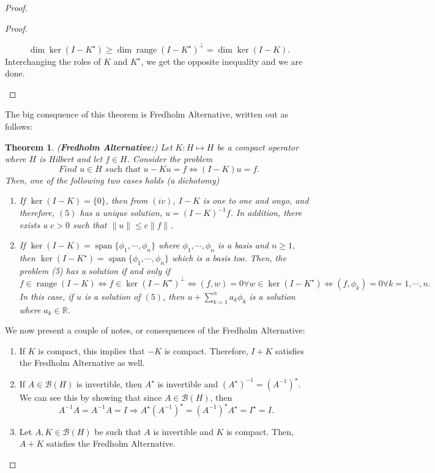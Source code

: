\documentclass[oneside]{book}
\newtheorem{theorem}{Theorem}
\newcommand{\R}{{\mathbb R}}
\newcommand{\B}{\mathscr{B}}
\DeclareMathOperator{\range}{range}
\newcommand{\Ks}{K^{\star}}
\newcommand{\As}{A^{\star}}
\DeclareMathOperator*{\spa}{span}
\begin{document}
\begin{proof}
\begin{proof}
\begin{enumerate}
\[ \dim \ker(I - \Ks) \geq \dim \range(I - \Ks)^{\perp} = \dim\ker(I - K). \]
Interchanging the roles of $K$ and $\Ks$, we get the opposite inequality and we are done. 
\end{enumerate}
\end{proof}
The big consquence of this theorem is Fredholm Alternative, written out as follows: 
\begin{theorem}(\textbf{Fredholm Alternative:}) Let $K: H \mapsto H$ be a compact operator where $H$ is Hilbert and let $f \in H$. Consider the problem 
\begin{equation}
\textit{Find $u \in H$ such that $u - Ku = f \Longleftrightarrow (I - K)u = f$}.
\end{equation}
Then, one of the following two cases holds (a dichotomy)
\begin{enumerate}
\item[1)] If $\ker(I - K) = \{ 0 \}$, then from $(iv)$, $I - K$ is one to one and onyo, and therefore, $(5)$ has a unique solution, $u = (I - K)^{-1} f$. In addition, there exists a $c > 0$ such that $ \| u \| \leq c \|f \|$. 
\item[2)] If $\ker(I - K) = \spa \{ \phi_1, \cdots, \phi_n \}$ where $\phi_1, \cdots, \phi_n$ is a basis and $n \geq 1$, then $\ker(I - \Ks) = \spa\{ \phi_1, \cdots, \phi_n \}$ which is a basis too. Then, the problem (5) has a solution if and only if
\[ f \in \range(I - K) \Leftrightarrow f \in \ker(I - \Ks)^{\perp} \Leftrightarrow (f, w) = 0  \forall w \in \ker(I - \Ks) \Leftrightarrow (f, \phi_k) = 0 \forall k = 1, \cdots, n.\]
In this case, if $u$ is a solution of $(5)$, then $u + \sum\limits_{ k = 1}^n a_k \phi_k$ is a solution where $a_k \in \R$. 
\end{enumerate}
\end{theorem} 
We now present a couple of notes, or consequences of the Fredholm Alternative:
\begin{enumerate}
\item If $K$ is compact, this implies that $-K$ is compact. Therefore, $I + K$ satisfies the Fredholm Alternative as well.
\item If $A \in \B(H)$ is invertible, then $A^{\star}$ is invertible and $(\As)^{-1} = (A^{-1})^{\star}$. We can see this by showing that since $A \in \B(H)$, then 
\[ A^{-1} A = A^{-1} A = I \Longrightarrow \As(A^{-1})^{\star} = (A^{-1})^{\star} \As = I^{\star} = I.\]
\item Let $A, K \in \B(H)$ be such that $A$ is invertible and $K$ is compact. Then, $A + K$ satisfies the Fredholm Alternative. 

\end{enumerate}
\end{proof}
\end{document}

